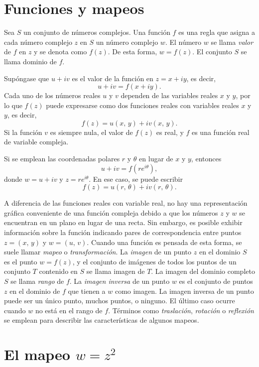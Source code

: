 \documentclass[a4paper]{report}
\begin{document}
\section{Funciones y mapeos}

Sea \(S\) un conjunto de números complejos. Una función \(f\) es una regla que asigna a cada número complejo \(z\) en \(S\) un número complejo \(w\). El número \(w\) se llama \emph{valor} de \(f\) en \(z\) y se denota como \(f(z)\). De esta forma, \(w=f(z)\). El conjunto \(S\) se llama dominio de \(f\).

Supóngase que \(u+iv\) es el valor de la función en \(z=x+iy\), es decir,
\[
 u+iv=f(x+iy).
\]
Cada uno de los números reales \(u\) y \(v\) dependen de las variables reales \(x\) y \(y\), por lo que \(f(z)\) puede expresarse como dos funciones reales con variables reales \(x\) y \(y\), es decir,
\[
 f(z)=u(x,\,y)+iv(x,\,y).
\]
Si la función \(v\) es siempre nula, el valor de \(f(z)\) es real, y \(f\) es una función real de variable compleja.

Si se emplean las coordenadas polares \(r\) y \(\theta\) en lugar de \(x\) y \(y\), entonces
\[
 u+iv=f(re^{i\theta}),
\]
donde \(w=u+iv\) y \(z=re^{i\theta}\). En ese caso, se puede escribir
\[
 f(z)=u(r,\,\theta)+iv(r,\,\theta).
\]

A diferencia de las funciones reales con variable real, no hay una representación gráfica conveniente de una función compleja debido a que los números \(z\) y \(w\) se encuentran en un plano en lugar de una recta. Sin embargo, es posible exhibir información sobre la función indicando pares de correspondencia entre puntos \(z=(x,\,y)\) y \(w=(u,\,v)\). Cuando una función es pensada de esta forma, se suele llamar \emph{mapeo} o \emph{transformación}. La \emph{imagen} de un punto \(z\) en el dominio \(S\) es el punto \(w=f(z)\), y el conjunto de imágenes de todos los puntos de un conjunto \(T\) contenido en \(S\) se llama imagen de \(T\). La imagen del dominio completo \(S\) se llama \emph{rango} de \(f\). La \emph{imagen inversa} de un punto \(w\) es el conjunto de puntos \(z\) en el dominio de \(f\) que tienen a \(w\) como imagen. La imagen inversa de un punto puede ser un único punto, muchos puntos, o ninguno. El último caso ocurre cuando \(w\) no está en el rango de \(f\). Términos como \emph{traslación}, \emph{rotación} o \emph{reflexión} se emplean para describir las características de algunos mapeos.

\section{El mapeo \texorpdfstring{\(w=z^2\)}{w=z2}}\label{sec:square_mapping}
\end{document}
